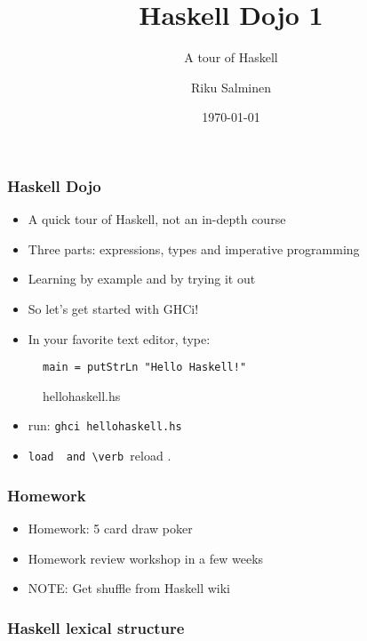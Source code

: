 \documentclass{beamer}
\title{Haskell Dojo 1}
\subtitle{A tour of Haskell}
\date{\today}
\author{Riku Salminen}
\begin{document}
\frame{\titlepage}

\begin{frame}[fragile]
\frametitle{Haskell Dojo}

\begin{itemize}
\item A quick tour of Haskell, not an in-depth course
\item Three parts: expressions, types and imperative programming
\item Learning by example and by trying it out
\item So let's get started with GHCi!
\item In your favorite text editor, type:
\end{itemize}

\begin{figure}[h!]
\caption{hellohaskell.hs}
\begin{verbatim}
main = putStrLn "Hello Haskell!"
\end{verbatim}
\end{figure}

\begin{itemize}
\item run: \verb+ghci hellohaskell.hs+
\item \verb :load  and \verb :reload .

\end{itemize}
\end{frame}


\begin{frame}[fragile]
\frametitle{Homework}

\begin{itemize}
\item Homework: 5 card draw poker
\item Homework review workshop in a few weeks
\item NOTE: Get shuffle from Haskell wiki
\end{itemize}
\end{frame}


\begin{frame}[fragile]
\frametitle{Haskell lexical structure}

\end{frame}
\end{document}
